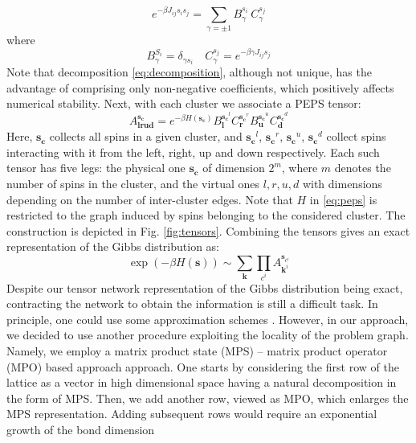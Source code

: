 \begin{equation}
  e^{-\beta J_{ij}s_i s_j} = \sum_{\gamma = \pm 1} B^{s_{i\phantom{j}}}_\gamma C^{s_j}_\gamma
\end{equation}
where
\begin{equation}
  \label{eq:decomposition}
  B^{S_i}_\gamma = \delta_{\gamma s_i} \quad C^{s_j}_\gamma = e^{-\beta \gamma J_{ij} s_j}
\end{equation}
Note that decomposition \eqref{eq:decomposition}, although not unique, has the
advantage of comprising only non-negative coefficients, which positively
affects numerical stability. Next, with each cluster we associate a PEPS tensor:
\begin{equation}
  \label{eq:peps}
  A^{\mathbf{s_c}}_{\mathbf{lrud}} = e^{-\beta H(\mathbf{s_c})} B^{\mathbf{s_c}^l}_\mathbf{l}C^{\mathbf{s_c}^r}_\mathbf{r}B^{\mathbf{s_c}^u}_\mathbf{u}C^{\mathbf{s_c}^d}_\mathbf{d}
\end{equation}
Here, $\mathbf{s_c}$ collects all spins in a given cluster, and
$\mathbf{s_c}^l$, $\mathbf{s_c}^r$, $\mathbf{s_c}^u$, $\mathbf{s_c}^d$ collect
spins interacting with it from the left, right, up and down respectively. Each
such tensor has five legs: the physical one $\mathbf{s_c}$ of dimension $2^m$,
where $m$ denotes the number of spins in the cluster, and the virtual ones $l,
  r, u, d$ with dimensions depending on the number of inter-cluster edges. Note
that $H$ in \eqref{eq:peps} is restricted to the graph induced by spins
belonging to the considered cluster. The construction is depicted in Fig.
\ref{fig:tensors}. Combining the tensors gives an exact representation of the
Gibbs distribution as:
\begin{equation}
  \exp(-\beta H(\mathbf{s})) \sim \sum_{\mathbf{k}}\prod_{c^{i}}A_{\mathbf{k}^{i}}^{\mathbf{s}_{c^{i}}}
\end{equation}
Despite our tensor network representation of the Gibbs distribution being
exact, contracting the network to obtain the information is still a difficult
task. In principle, one could use some approximation schemes \cite{lewenstein}.
However, in our approach, we decided to use another procedure exploiting the
locality of the problem graph. Namely, we employ a matrix product state (MPS)
-- matrix product operator (MPO) based approach \cite{murg} approach. One
starts by considering the first row of the lattice as a vector in high
dimensional space having a natural decomposition in the form of MPS. Then, we
add another row, viewed as MPO, which enlarges the MPS representation. Adding
subsequent rows would require an exponential growth of the bond dimension
